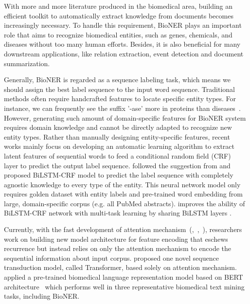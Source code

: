 With more and more literature produced in the biomedical area, building an efficient toolkit to automatically extract knowledge from documents becomes increasingly necessary. To handle this requirement, BioNER plays an important role that aims to recognize biomedical entities, such as genes, chemicals, and diseases without too many human efforts. Besides, it is also beneficial for many downstream applications, like relation extraction, event detection and document summarization. 

Generally, BioNER is regarded as a sequence labeling task, which means we should assign the best label sequence to the input word sequence. Traditional methods often require handcrafted features to locate specific entity types. For instance, we can frequently see the suffix '-ase' more in proteins than diseases~\citep{habibi2017deep}. However, generating such amount of domain-specific features for BioNER system requires domain knowledge and cannot be directly adapted to recognize new entity types. Rather than manually designing entity-specific features, recent works mainly focus on developing an automatic learning algorithm to extract latent features of sequential words to feed a conditional random field (CRF)~\citep{lafferty2001conditional} layer to predict the output label sequence. \citet{habibi2017deep} followed the suggestion from \citet{lample2016neural} and proposed BiLSTM-CRF model to predict the label sequence with completely agnostic knowledge to every type of the entity. This neural network model only requires golden dataset with entity labels and pre-trained word embedding from large, domain-specific corpus (e.g. all PubMed abstracts). \citet{wang2018cross} improves the ability of BiLSTM-CRF network with multi-task learning by sharing BiLSTM layers .

Currently, with the fast development of attention mechanism~(\citet{vaswani2017attention},~\citet{bah2015},~\citet{LuongPM15}), researchers work on building new model architecture for feature encoding that eschews recurrence but instead relies on only the attention mechanism to encode the sequential information about input corpus. \citet{vaswani2017attention} proposed one novel sequence transduction model, called Transformer, based solely on attention mechanism. \citet{lee2019biobert} applied a pre-trained biomedical language representation model based on BERT architecture~\citep{devlin2018bert} which performs well in three representative biomedical text mining tasks, including BioNER. 

